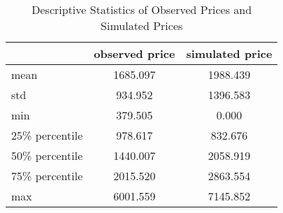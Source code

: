 \begin{table}[H]
    \centering
    \caption{Descriptive Statistics of Observed Prices and Simulated Prices}
    \label{table: fit_of_model}
    \begin{tabular}{lcc}
        \toprule
                        & observed price & simulated price \\
        \midrule
        mean            & 1685.097       & 1988.439        \\
        std             & 934.952        & 1396.583        \\
        min             & 379.505        & 0.000           \\
        25\% percentile & 978.617        & 832.676         \\
        50\% percentile & 1440.007       & 2058.919        \\
        75\% percentile & 2015.520       & 2863.554        \\
        max             & 6001.559       & 7145.852        \\
        \bottomrule
    \end{tabular}
\end{table}
